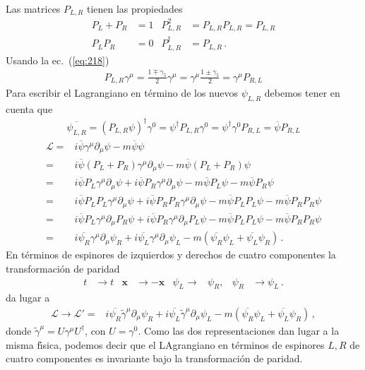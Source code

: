 Las matrices $P_{L,R}$ tienen las propiedades
\begin{align}
  P_L+P_R&=1 & P_{L,R}^2&=P_{L,R}P_{L,R}=P_{L,R}\nonumber\\
  P_L P_R&=0& P_{L,R}^\dagger&=P_{L,R}\,.
\end{align}
Usando la ec.~(\ref{eq:218})
\begin{align}
  P_{L,R}\gamma^\mu=\frac{1\mp\gamma_5}{2}\gamma^\mu=\gamma^\mu\frac{1\pm\gamma_5}{2}=\gamma^\mu P_{R,L}
\end{align}
Para escribir el Lagrangiano en t\'ermino de los nuevos $\psi_{L,R}$ debemos tener en cuenta que
\begin{align}
  \overline{\psi_{L,R}}=(P_{L,R}\psi)^\dagger\gamma^0=\psi^\dagger P_{L,R}\gamma^0=\psi^\dagger\gamma^0P_{R,L}=\overline{\psi}P_{R,L}
\end{align}
\begin{align}
  \label{eq:221}
  \mathcal{L}=&i\overline{\psi}\gamma^\mu\partial_\mu\psi-m\overline{\psi}\psi\nonumber\\
  =&i\overline{\psi}(P_L+P_R)\gamma^\mu\partial_\mu\psi-m\overline{\psi}(P_L+P_R)\psi\nonumber\\
  =&i\overline{\psi}P_L\gamma^\mu\partial_\mu\psi+i\overline{\psi}P_R\gamma^\mu\partial_\mu\psi-m\overline{\psi}P_L\psi-m\overline{\psi}P_R\psi\nonumber\\
  =&i\overline{\psi}P_L P_L\gamma^\mu\partial_\mu\psi+i\overline{\psi}P_R P_R\gamma^\mu\partial_\mu\psi-m\overline{\psi}P_L P_L\psi-m\overline{\psi}P_R P_R\psi\nonumber\\
  =&i\overline{\psi}P_L\gamma^\mu\partial_\mu P_R\psi+i\overline{\psi}P_R\gamma^\mu\partial_\mu P_L\psi-m\overline{\psi}P_L P_L\psi-m\overline{\psi}P_R P_R\psi\nonumber\\
  =&i\overline{\psi_R}\gamma^\mu\partial_\mu\psi_R+i\overline{\psi_L}\gamma^\mu\partial_\mu\psi_L-m(\overline{\psi_R}\psi_L+\overline{\psi_L}\psi_R)\,.
\end{align}
En t\'erminos de espinores de izquierdos y derechos de cuatro componentes la transformaci\'on de paridad 
\begin{align}
  \label{eq:220}
  t&\to t&\mathbf{x}&\to -\mathbf{x}&\psi_L\to&\psi_R,& \psi_R&\to\psi_L\,.
\end{align}
da lugar a
\begin{align}
   \mathcal{L}\to\mathcal{L}'=&i\overline{\psi_R}\tilde\gamma^\mu\partial_\mu\psi_R+i\overline{\psi_L}\tilde\gamma^\mu\partial_\mu\psi_L-m(\overline{\psi_R}\psi_L+\overline{\psi_L}\psi_R)\,,
\end{align}
donde $\tilde\gamma^\mu=U\gamma^\mu U^\dagger$, con $U=\gamma^0$. Como las dos representaciones dan lugar a la misma f\'\i sica, podemos decir que el LAgrangiano en t\'erminos de espinores $L,R$ de cuatro componentes es invariante bajo la transformaci\'on de paridad.


